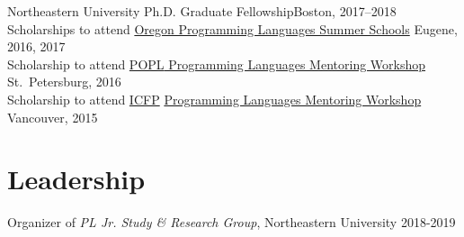 \documentclass[margin,line]{resume}
\begin{document}
\begin{resume}
    Northeastern University Ph.D. Graduate Fellowship\hfill Boston, 2017--2018\\[\mymedskip]
    Scholarships to attend
    \href{https://www.cs.uoregon.edu/research/summerschool/summer17}
    {Oregon Programming Languages Summer Schools} \hfill %
    Eugene, 2016, 2017\\[\mymedskip]
    Scholarship to attend 
     \href{http://conf.researchr.org/home/PLMW-2016}{{\small POPL}
        Programming Languages Mentoring Workshop} \hfill St.~Petersburg, 2016\\[\mymedskip]
            Scholarship to attend
           \href{http://icfpconference.org/icfp2015/}{{\small ICFP}}
           \href{https://www.cis.upenn.edu/~sweirich/icfp-plmw15/}
                {Programming Languages Mentoring Workshop}
\hfill         Vancouver, %
2015


   
    \section{\mysidestyle Leadership} 
     Organizer of \emph{PL Jr. Study \& Research Group}, Northeastern University \hfill 2018-2019

    \newpage



\end{resume}
\end{document}
